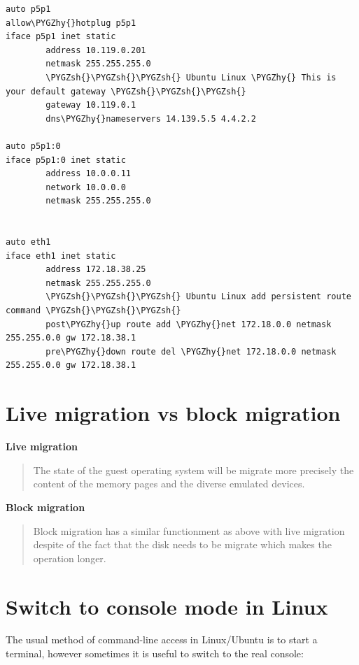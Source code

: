 \documentclass[letterpaper,10pt,english]{sphinxmanual}
\def\PYGZsh{\char`\#}
\def\PYGZhy{\char`\-}
\begin{document}
\begin{Verbatim}[commandchars=\\\{\}]
auto p5p1
allow\PYGZhy{}hotplug p5p1
iface p5p1 inet static
        address 10.119.0.201
        netmask 255.255.255.0
        \PYGZsh{}\PYGZsh{}\PYGZsh{} Ubuntu Linux \PYGZhy{} This is your default gateway \PYGZsh{}\PYGZsh{}\PYGZsh{}
        gateway 10.119.0.1
        dns\PYGZhy{}nameservers 14.139.5.5 4.4.2.2

auto p5p1:0
iface p5p1:0 inet static
        address 10.0.0.11
        network 10.0.0.0
        netmask 255.255.255.0


auto eth1
iface eth1 inet static
        address 172.18.38.25
        netmask 255.255.255.0
        \PYGZsh{}\PYGZsh{}\PYGZsh{} Ubuntu Linux add persistent route command \PYGZsh{}\PYGZsh{}\PYGZsh{}
        post\PYGZhy{}up route add \PYGZhy{}net 172.18.0.0 netmask 255.255.0.0 gw 172.18.38.1
        pre\PYGZhy{}down route del \PYGZhy{}net 172.18.0.0 netmask 255.255.0.0 gw 172.18.38.1
\end{Verbatim}


\section{Live migration vs block migration}
\label{_source/things/live_vs_block:live-migration-vs-block-migration}\label{_source/things/live_vs_block::doc}
\textbf{Live migration}
\begin{quote}

The state of the guest operating system will be migrate more precisely the content of the memory pages and the diverse emulated devices.
\end{quote}

\textbf{Block migration}
\begin{quote}

Block migration has a similar functionment as above with live migration despite of the fact that the disk needs to be migrate which makes the operation longer.
\end{quote}


\section{Switch to console mode in Linux}
\label{_source/things/switch_to_console:switch-to-console-mode-in-linux}\label{_source/things/switch_to_console::doc}
The usual method of command-line access in Linux/Ubuntu is to start a terminal, however sometimes it is useful to switch to the real console:
\end{document}
